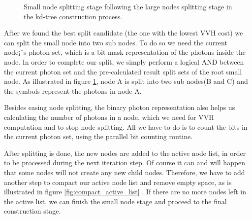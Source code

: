 \begin{figure}[ftp] 
    \centering 
    \renewcommand{\thefigure}{\thechapter.\arabic{figure}}
    \caption[The Small Nodes splitting stage within kd-tree construction]{Small node splitting stage following the large nodes  splitting stage in the kd-tree construction process.}
    \label{fig:small_node_splitting} 
\end{figure} 

After we found the best split candidate (the one with the lowest VVH cost) we can split the small node into two sub nodes. To do so we need the current node¡¯s photon set, which is a bit mask representation of the photons inside the node. In order to complete our split, we simply perform a logical AND between the current photon set and the pre-calculated result split sets of the root small node. As illustrated in figure \ref{fig:small_node_splitting}, node A is split into two sub nodes(B and C) and the symbols represent the photons in node A. 

Besides easing node splitting, the binary photon representation also helps us calculating the number of photons in a node, which we need for VVH computation and to stop node splitting. All we have to do is to count the bits in the current photon set, using the parallel bit counting routine. 

After splitting is done, the new nodes are added to the active node list, in order to be processed during the next iteration step. Of course it can and will happen that some nodes will not create any new child nodes. Therefore, we have to add another step to compact our active node list and remove empty space, as is illustrated in figure \ref{fig:compact_active_list} \cite{Lauterbach09fastbvh}. If there are no more nodes left in the active list, we can finish the small node stage and proceed to the final construction stage. 

